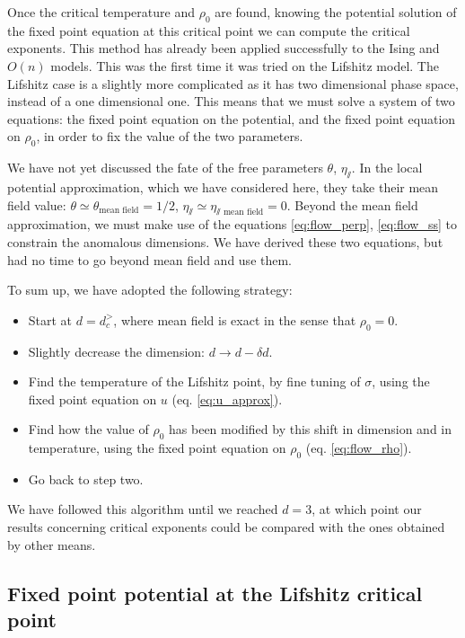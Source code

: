 Once the critical temperature and $\rho_0$ are found, knowing the potential solution of the fixed point equation at this critical point we can compute the critical exponents. This method has already been applied successfully to the Ising \cite{CodelloIsing} and $O(n)$ \cite{CodelloOn} models. This was the first time it was tried on the Lifshitz model.
 The Lifshitz case is a slightly more complicated as it has two dimensional phase space, instead of a one dimensional one. This means that we must solve a system of two equations: the fixed point equation on the potential, and the fixed point equation on $\rho_0$, in order to fix the value of the two parameters.

We have not yet discussed the fate of the free parameters $\theta$, $\eta_\sslash$. In the local potential approximation, which we have considered here, they take their mean field value: $\theta \simeq \theta_{\text{mean field}} =  1/2$, $\eta_\sslash \simeq \eta_{\sslash\text{~mean field}} = 0$.
Beyond the mean field approximation, we must make use of the equations \eqref{eq:flow_perp}, \eqref{eq:flow_ss} to constrain the anomalous dimensions. We have derived these two equations, but had no time to go beyond mean field and use them.


To sum up, we have adopted the following strategy:
\begin{itemize}
\item Start at $d=d_c^>$, where mean field is exact in the sense that $\rho_0 = 0$.
\item Slightly decrease the dimension: $d \rightarrow d - \delta d$. 
\item Find the temperature of the Lifshitz point, by fine tuning of $\sigma$, using the fixed point equation on $u$ (eq. \eqref{eq:u_approx}).
\item Find how the value of $\rho_0$ has been modified by this shift in dimension and in temperature, using the fixed point equation on $\rho_0$ (eq. \eqref{eq:flow_rho}).
\item Go back to step two.
\end{itemize}
We have followed this algorithm until we reached $d=3$, at which point our results concerning critical exponents could be compared with the ones obtained by other means.

\subsection{Fixed point potential at the Lifshitz critical point}

